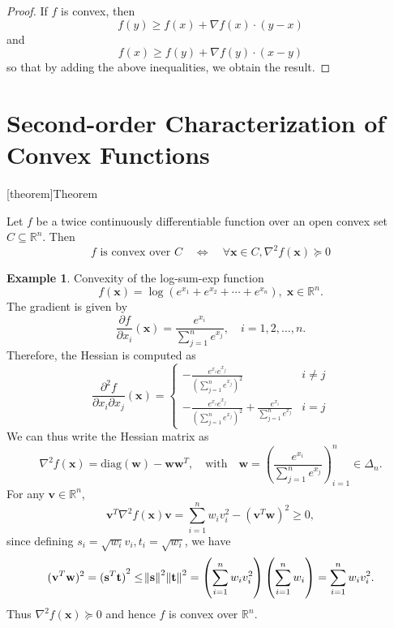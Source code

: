 \documentclass[12pt]{report}
\theoremstyle{definition}
\begin{document}
\begin{proof}
    If $f$ is convex, then
    \[
        f(y)\ge f(x)+\nabla f(x)\cdot(y-x)
    \]
    and
    \[
        f(x)\ge f(y)+\nabla f(y)\cdot(x-y)
    \]
    so that by adding the above inequalities, we obtain the result.
\end{proof} 

\section{Second-order Characterization of Convex Functions}

[theorem]{Theorem}
\begin{second-order characterization of convexity}
    Let $f$ be a twice continuously differentiable function over an open convex
    set $C\subseteq\mathbb{R}^{n}$. Then
    \[
        f\text{ is convex over }C
        \quad\iff\quad
        \forall\mathbf{x}\in C,
        \nabla^2f(\mathbf{x})\succeq 0
    \]
\end{second-order characterization of convexity}

\newtheorem{second-order characterization of convexity eg}[theorem]{Example}
\begin{second-order characterization of convexity eg}
    Convexity of the log-sum-exp function
    \[
        f(\mathbf{x})=\log{(e^{x_1}+e^{x_2}+\cdots+e^{x_n})},\;\mathbf{x}\in\mathbb{R}^{n}.
    \]
    The gradient is given by
    \[
        \frac{\partial f}{\partial
        x_i}(\mathbf{x})=\frac{e^{x_i}}{\sum_{j=1}^{n} e^{x_j}},
        \quad i=1,2,\ldots,n.
    \]
    Therefore, the Hessian is computed as
    \[
        \frac{\partial^2f}{\partial x_i\partial x_j}(\mathbf{x})=
        \begin{cases}
            -\frac{e^{x_i}e^{x_j}}{{\left(\sum_{j=1}^{n} e^{x_j}\right)}^{2}}
            & i \neq j \\
            -\frac{e^{x_i}e^{x_j}}{{\left(\sum_{j=1}^{n} e^{x_j}\right)}^{2}}
            +\frac{e^{x_i}}{\sum_{j=1}^{n} e^{x_j}}
            & i = j
        \end{cases} 
    \]
    We can thus write the Hessian matrix as
    \[
        \nabla^2f(\mathbf{x})=\text{diag}(\mathbf{w})-\mathbf{w}\mathbf{w}^T,
        \quad\text{with}\quad
        \mathbf{w}={\left(\frac{e^{x_i}}{\sum_{j=1}^{n}
        e^{x_j}}\right)}^{n}_{i=1}
        \in\Delta_n.
    \]
    For any $\mathbf{v}\in\mathbb{R}^{n}$,
    \[
        \mathbf{v}^T\nabla^2f(\mathbf{x})\mathbf{v}=
        \sum_{i=1}^{n} w_iv_i^2-{(\mathbf{v}^T\mathbf{w})}^{2}\ge 0,
    \]
    since defining $s_i=\sqrt{w_i}v_i,t_i=\sqrt{w_i}$, we have
    \[
        (\mathbf{v}^T\mathbf{w})^2={(\mathbf{s}^T\mathbf{t})}^{2}
        \le\norm{\mathbf{s}}^2\norm{\mathbf{t}}^2
        =\left(\sum_{i=1}^{n} w_iv_i^2\right)\left(\sum_{i=1}^{n} w_i\right)
        =\sum_{i=1}^{n} w_iv_i^2.
    \]
    Thus $\nabla^2f(\mathbf{x})\succeq 0$ and hence $f$ is convex over
    $\mathbb{R}^{n}$.
\end{second-order characterization of convexity eg}
\end{document}
